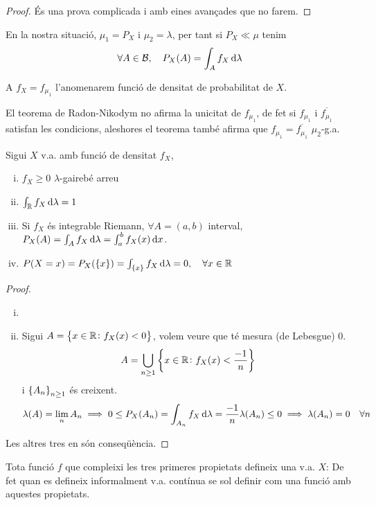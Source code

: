 \begin{proof}
    És una prova complicada i amb eines avançades que no farem.
\end{proof}

\begin{col}
    En la nostra situació, $\mu_1 = P_X$ i $\mu_2 = \lambda$, per tant si $P_X \ll \mu$ tenim
    \[\forall A \in\B,\quad P_X(A) = \int_A f_{X}\dif\lambda\] %
\end{col}

\begin{defi}
    A $f_X = f_{\mu_1}$ l'anomenarem funció de densitat de probabilitat de $X$.
\end{defi}

\begin{obs}
    El teorema de Radon-Nikodym no afirma la unicitat de $f_{\mu_1}$, de fet si $f_{\mu_1}$ i $\overline{f_{\mu_1}}$ satisfan les
    condicions, aleshores el teorema també afirma que $f_{\mu_1} = \overline{f_{\mu_1}}$ $\mu_2$-g.a.
\end{obs}

\begin{prop}
    Sigui $X$ v.a. amb funció de densitat $f_X$,
    \begin{enumerate}[i)]
        \item $f_X \ge 0$ $\lambda$-gairebé arreu
        \item $\int_\real f_X \dif\lambda = 1$
        \item Si $f_X$ és integrable Riemann, $\forall A = (a,b)$ interval, $P_X(A) = \int_A f_X\dif\lambda = \int_a^b f_X(x)\dif x$.
        \item $P(X=x) = P_X(\{x\}) = \int_{\{x\}} f_X \dif\lambda = 0, \quad\forall x\in\real$
    \end{enumerate}
\end{prop}

\begin{proof}
    \begin{enumerate}[i)]
        \item{}
        \item Sigui $A = \left\{ x\in\mathbb{R} \colon f_X(x)<0 \right\}$, volem veure que té mesura (de Lebesgue) 0.
            \[A = \bigcup_{n \ge 1} \left\{ x\in\mathbb{R} \colon f_X(x)<\frac{-1}{n} \right\}\]
            i $\left\{ A_n \right\}_{n \ge 1}$ és creixent.
            \[\lambda(A) = \lim_{n}A_n \implies 0 \le P_X(A_n) = \int_{A_n} f_X \dif\lambda = \frac{-1}{n}\lambda(A_n) \le 0 \implies \lambda(A_n)=0 \quad\forall n\]
    \end{enumerate}
    Les altres tres en són conseqüència.
\end{proof}

\begin{obs}
    Tota funció $f$ que compleixi les tres primeres propietats defineix una v.a. $X$:
    De fet quan es defineix informalment v.a. contínua se sol definir com una funció amb aquestes propietats.
\end{obs}


















